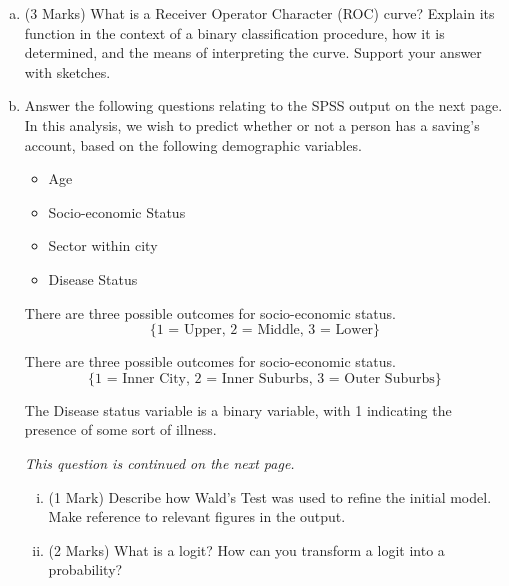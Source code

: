 \documentclass[a4paper,12pt]{article}
\begin{document}
\begin{enumerate}
\begin{enumerate}[(a)]
			
\bigskip
		\item (3 Marks) What is a Receiver Operator Character (ROC) curve? Explain its function in the context of a binary classification procedure, how it is determined, and the means of interpreting the curve. Support your answer with sketches.	
	
\bigskip 


\item Answer the following questions relating to the SPSS output on the next page. In this analysis, we wish to predict whether or not a person has a saving's account, based on the following demographic variables.

\begin{itemize}
	\item Age
	\item Socio-economic Status
	\item Sector within city
	\item Disease Status
\end{itemize}
There are three possible outcomes for socio-economic status.
\[\{\mbox{1 = Upper, 2 = Middle, 3 = Lower}\}\]

There are three possible outcomes for socio-economic status.
\[\{\mbox{1 = Inner City, 2 = Inner Suburbs, 3 = Outer Suburbs}\}\]

The Disease status variable is a binary variable, with 1 indicating the presence of some sort of illness.

\noindent \textit{This question is continued on the next page.}





\begin{enumerate}[(i)]
\item (1 Mark) Describe how Wald's Test was used to refine the initial model. Make reference to relevant figures in the output.
\item (2 Marks)
What is a logit? How can you transform a logit into a probability?


\end{enumerate}
\end{enumerate}
\end{enumerate}
\end{document}
